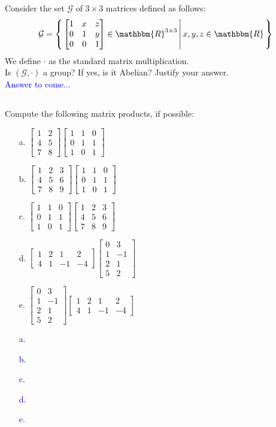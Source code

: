 \documentclass[a4paper,12pt]{article}
\newcommand{\R}{\mathbbm{R}}
\newcommand{\M}[1]{ \begin{bmatrix} #1 \end{bmatrix} }
\newcommand{\vsp}[1]{\vspace{#1mm}\\}
\begin{document}
\subsection{}
Consider the set $\mathcal{G}$ of $3 \times 3$ matrices defined as follows:
$$\mathcal{G} = \left\{ \, \M{1&x&z\\0&1&y\\0&0&1} \in \R^{3 \times 3} \, \middle| \, x,y,z \in \R \, \right\}$$
We define $\cdot$ as the standard matrix multiplication.\\
Is $(\mathcal{G},\cdot)$ a group? If yes, is it Abelian? Justify your answer.
\vsp{3}
\textcolor{blue}{
Answer to come...
}
\subsection{}
Compute the following matrix products, if possible:
\begin{itemize}
 \item [a.] $\M{1&2\\4&5\\7&8} \M{1&1&0\\0&1&1\\1&0&1}$
 \item [b.] $\M{1&2&3\\4&5&6\\7&8&9} \M{1&1&0\\0&1&1\\1&0&1}$
 \item [c.] $\M{1&1&0\\0&1&1\\1&0&1} \M{1&2&3\\4&5&6\\7&8&9}$
 \item [d.] $\M{1&2&1&2\\4&1&-1&-4} \M{0&3\\1&-1\\2&1\\5&2}$
 \item [e.] $\M{0&3\\1&-1\\2&1\\5&2} \M{1&2&1&2\\4&1&-1&-4}$
\end{itemize}
\textcolor{blue}{
\begin{itemize}
 \item [a.]
 \item [b.]
 \item [c.]
 \item [d.]
 \item [e.]
\end{itemize}
}
\end{document}
